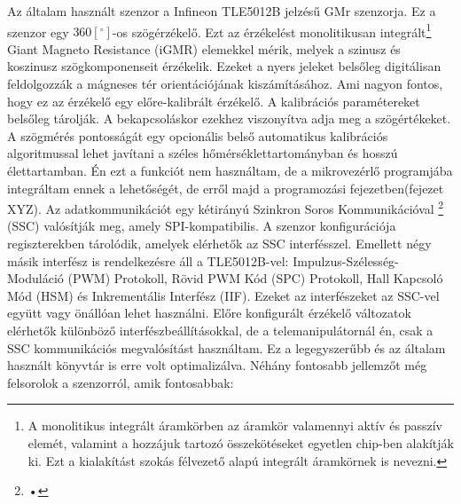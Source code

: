 Az általam használt szenzor a Infineon TLE5012B jelzésű GMr szenzorja. Ez a szenzor egy $360[^\circ]$-os szögérzékelő. Ezt az érzékelést monolitikusan integrált\footnote{A monolitikus integrált áramkörben az áramkör valamennyi aktív és passzív elemét, valamint a hozzájuk tartozó összekötéseket egyetlen chip-ben alakítják ki. Ezt a kialakítást szokás félvezető alapú integrált áramkörnek is nevezni.} Giant Magneto Resistance (iGMR) elemekkel mérik, melyek a szinusz és koszinusz szögkomponenseit érzékelik. Ezeket a nyers jeleket belsőleg digitálisan feldolgozzák a mágneses tér orientációjának kiszámításához. Ami nagyon fontos, hogy ez az érzékelő egy előre-kalibrált érzékelő. A kalibrációs paramétereket belsőleg tárolják. A bekapcsoláskor ezekhez viszonyítva adja meg a szögértékeket. A szögmérés pontosságát egy opcionális belső automatikus kalibrációs algoritmussal lehet javítani a széles hőmérséklettartományban és hosszú élettartamban. Én ezt a funkciót nem használtam, de a mikrovezérlő programjába integráltam ennek a lehetőségét, de erről majd a programozási fejezetben(fejezet XYZ). Az adatkommunikációt egy kétirányú Szinkron Soros Kommunikációval \footnote{•} (SSC) valósítják meg, amely SPI-kompatibilis. A szenzor konfigurációja regiszterekben tárolódik, amelyek elérhetők az SSC interfésszel. Emellett négy másik interfész is rendelkezésre áll a TLE5012B-vel: Impulzus-Szélesség-Moduláció (PWM) Protokoll, Rövid PWM Kód (SPC) Protokoll, Hall Kapcsoló Mód (HSM) és Inkrementális Interfész (IIF). Ezeket az interfészeket az SSC-vel együtt vagy önállóan lehet használni. Előre konfigurált érzékelő változatok elérhetők különböző interfészbeállításokkal, de a telemanipulátornál én, csak a SSC kommunikációs megvalósítást használtam. Ez a legegyszerűbb és az általam használt könyvtár is erre volt optimalizálva. Néhány fontosabb jellemzőt még felsorolok a szenzorról, amik fontosabbak:


